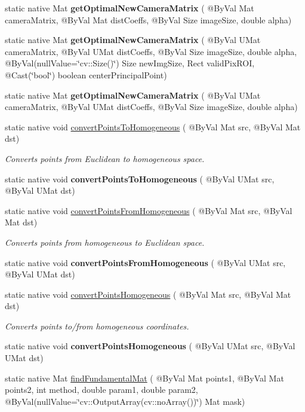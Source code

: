 \begin{DoxyCompactItemize}
static native Mat {\bfseries get\+Optimal\+New\+Camera\+Matrix} ( @By\+Val Mat camera\+Matrix, @By\+Val Mat dist\+Coeffs, @By\+Val Size image\+Size, double alpha)
\item 
static native Mat {\bfseries get\+Optimal\+New\+Camera\+Matrix} ( @By\+Val U\+Mat camera\+Matrix, @By\+Val U\+Mat dist\+Coeffs, @By\+Val Size image\+Size, double alpha, @By\+Val(null\+Value=\char`\"{}cv\+::\+Size()\char`\"{}) Size new\+Img\+Size, Rect valid\+Pix\+R\+OI, @Cast(\char`\"{}bool\char`\"{}) boolean center\+Principal\+Point)
\item 
static native Mat {\bfseries get\+Optimal\+New\+Camera\+Matrix} ( @By\+Val U\+Mat camera\+Matrix, @By\+Val U\+Mat dist\+Coeffs, @By\+Val Size image\+Size, double alpha)
\item 
static native void \hyperlink{group__calib3d_gaaf5de214950c5c904cd996ac5f73bff6}{convert\+Points\+To\+Homogeneous} ( @By\+Val Mat src, @By\+Val Mat dst)
\begin{DoxyCompactList}\small\item\em Converts points from Euclidean to homogeneous space. \end{DoxyCompactList}\item 
static native void {\bfseries convert\+Points\+To\+Homogeneous} ( @By\+Val U\+Mat src, @By\+Val U\+Mat dst)
\item 
static native void \hyperlink{group__calib3d_ga8d818140f4ee16a68518f61d0dbc2de9}{convert\+Points\+From\+Homogeneous} ( @By\+Val Mat src, @By\+Val Mat dst)
\begin{DoxyCompactList}\small\item\em Converts points from homogeneous to Euclidean space. \end{DoxyCompactList}\item 
static native void {\bfseries convert\+Points\+From\+Homogeneous} ( @By\+Val U\+Mat src, @By\+Val U\+Mat dst)
\item 
static native void \hyperlink{group__calib3d_gaaf02e05437bf63217e14cc47531a387b}{convert\+Points\+Homogeneous} ( @By\+Val Mat src, @By\+Val Mat dst)
\begin{DoxyCompactList}\small\item\em Converts points to/from homogeneous coordinates. \end{DoxyCompactList}\item 
static native void {\bfseries convert\+Points\+Homogeneous} ( @By\+Val U\+Mat src, @By\+Val U\+Mat dst)
\item 
static native Mat \hyperlink{group__calib3d_gaceb84b17990bba04533d8fe02ab1a1d2}{find\+Fundamental\+Mat} ( @By\+Val Mat points1, @By\+Val Mat points2, int method, double param1, double param2, @By\+Val(null\+Value=\char`\"{}cv\+::\+Output\+Array(cv\+::no\+Array())\char`\"{}) Mat mask)

\end{DoxyCompactItemize}
